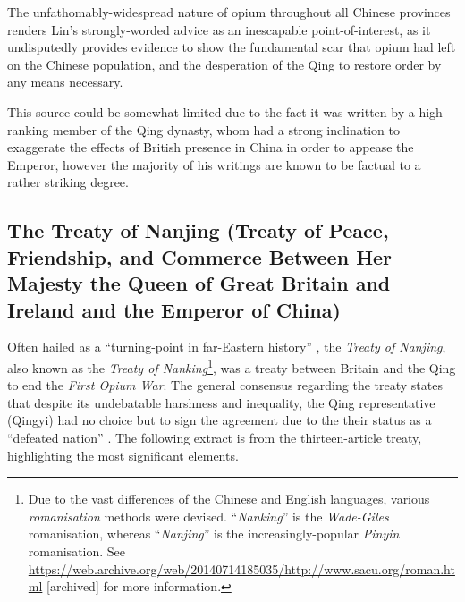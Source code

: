 \documentclass{article}
\begin{document}
The unfathomably-widespread nature of opium throughout all Chinese provinces renders Lin's strongly-worded advice as an inescapable point-of-interest, as it undisputedly provides evidence to show the fundamental scar that opium had left on the Chinese population, and the desperation of the Qing to restore order by any means necessary.

This source could be somewhat-limited due to the fact it was written by a high-ranking member of the Qing dynasty, whom had a strong inclination to exaggerate the effects of British presence in China in order to appease the Emperor, however the majority of his writings are known to be factual to a rather striking degree.

\subsection{The Treaty of Nanjing (Treaty of Peace, Friendship, and Commerce Between Her Majesty the Queen of Great Britain and Ireland and the Emperor of China)}

Often hailed as a ``turning-point in far-Eastern history''
\autocite{Fairbank:1940}, the \textit{Treaty of Nanjing}, also known as the \textit{Treaty of Nanking}\footnote{Due to the vast differences of the Chinese and English languages, various \textit{romanisation} methods were devised. ``\textit{Nanking}'' is the \textit{Wade-Giles} romanisation, whereas ``\textit{Nanjing}'' is the increasingly-popular \textit{Pinyin} romanisation. See \url{https://web.archive.org/web/20140714185035/http://www.sacu.org/roman.html} [archived] for more information.}, was a treaty between Britain and the Qing to end the \textit{First Opium War}. The general consensus regarding the treaty states that despite its undebatable harshness and inequality, the Qing representative (Qingyi) had no choice but to sign the agreement due to the their status as a ``defeated nation''
\autocite{Mao:2018}. The following extract is from the thirteen-article treaty, highlighting the most significant elements.

\end{document}
